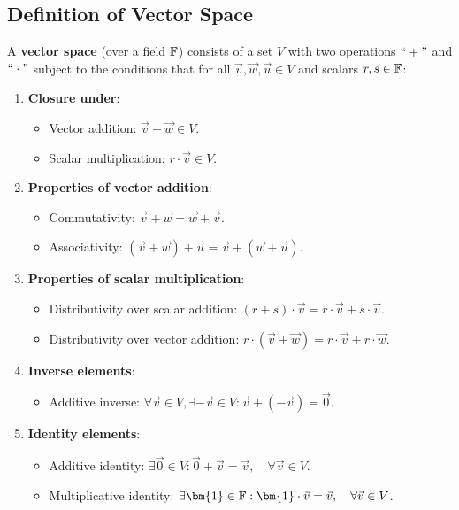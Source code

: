 \subsection{Definition of Vector Space}
\begin{definition}
	A \textbf{vector space} (over a field $\mathbb{F}$) consists of a set $V$ with two operations $``+"$ and $``\cdot"$ subject to the conditions that for all $\vec{v}, \vec{w}, \vec{u}\in V$ and scalars $r, s\in\mathbb{F}$:
	\begin{enumerate}
		\item \textbf{Closure under}:
		\begin{itemize}
			\item Vector addition: $\vec{v} + \vec{w} \in V$.
			\item Scalar multiplication: $r\cdot\vec{v} \in V$.
		\end{itemize}

		\item \textbf{Properties of vector addition}:
		\begin{itemize}
			\item Commutativity: $\vec{v} + \vec{w} = \vec{w} + \vec{v}$.
			\item Associativity: $(\vec{v} + \vec{w}) + \vec{u} = \vec{v} + (\vec{w} + \vec{u})$.
		\end{itemize} 

		\item \textbf{Properties of scalar multiplication}:
		\begin{itemize}
			\item Distributivity over scalar addition: $(r+s)\cdot\vec{v} = r\cdot\vec{v} + s\cdot\vec{v}$.	
			\item Distributivity over vector addition: $r\cdot(\vec{v} + \vec{w}) = r\cdot\vec{v} + r\cdot\vec{w}$.
		\end{itemize} 

		\item \textbf{Inverse elements}:
		\begin{itemize}
			\item Additive inverse: $\forall \vec{v}\in V, \exists -\vec{v}\in V: \vec{v} + (-\vec{v}) = \vec{0}$.	
		\end{itemize} 

		\item \textbf{Identity elements}:
		\begin{itemize}
			\item Additive identity: $\exists\vec{0} \in V: \vec{0} + \vec{v} = \vec{v}, \quad \forall \vec{v}\in V$.
			\item Multiplicative identity: $\exists \bm{1}\in\field: \bm{1}\cdot\vec{v} = \vec{v},\quad \forall \vec{v} \in V$.	
		\end{itemize} 
	\end{enumerate} 
\end{definition} 